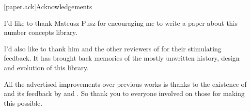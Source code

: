 

[paper.ack]{Acknowledgements}

\pnum
I'd like to thank Mateusz Pusz for encouraging me to write a paper about this number concepts library.

\pnum
I'd also like to thank him and the other reviewers of \hrefVII{} for their stimulating feedback.
It has brought back memories of the mostly unwritten history, design and evolution of this library.

\pnum
All the advertised improvements over previous works
is thanks to the existence of  and its feedback by  and \hrefVI{}.
So thank you to everyone involved on those for making this possible.
